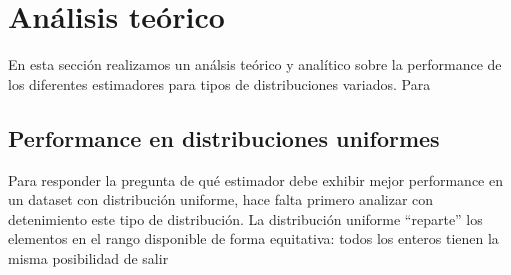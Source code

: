 \section{Análisis teórico}
En esta sección realizamos un análsis teórico y analítico sobre la performance de los diferentes estimadores para tipos de distribuciones variados. Para 

\subsection{Performance en distribuciones uniformes}
Para responder la pregunta de qué estimador debe exhibir mejor performance en un dataset con distribución uniforme, hace falta primero analizar con detenimiento este tipo de distribución. La distribución uniforme ``reparte'' los elementos en el rango disponible de forma equitativa: todos los enteros tienen la misma posibilidad de salir